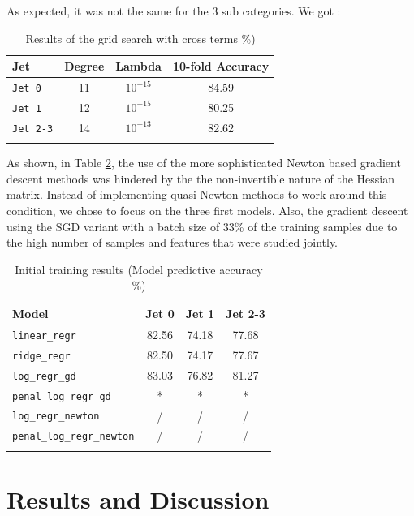 \documentclass[10pt,conference,compsocconf]{IEEEtran}
\begin{document}
As expected, it was not the same for the 3 sub categories. We got :
\begin{table}[h!]
\centering
\caption{Results of the grid search with cross terms \%)}
\footnotesize
\hspace{-0.2cm}
\begin{tabular}{ l| ccc } 
 \hline
   Jet & Degree & Lambda & 10-fold Accuracy  \\
 \hline
   \verb+Jet 0+  & 11 & $10^{-15}$  & 84.59  \\
   \verb+Jet 1+  & 12 & $10^{-15}$  & 80.25 \\
   \verb+Jet 2-3+  & 14  &  $10^{-13}$ & 82.62 \\
  \hline
\label{grid_search_ridge_cross}
\end{tabular}
\end{table}


As shown, in Table \ref{tab_first_run}, the use of the  more sophisticated Newton based  gradient descent methods was hindered by the the non-invertible nature of the Hessian matrix. Instead of implementing quasi-Newton methods to work around this condition, we chose to focus on the three first models. Also, the gradient descent using the SGD variant with a batch size of 33\% of the training samples due to the high number of samples and features that were studied jointly. 
 
\begin{table}[h!]
\centering
\caption{Initial training results (Model predictive accuracy \%)}
\footnotesize
\hspace{-0.2cm}
\begin{tabular}{ l| ccc } 
 \hline
   Model & Jet 0 & Jet 1 & Jet 2-3  \\
 \hline
   \verb+linear_regr+  & 82.56 &74.18  & 77.68  \\
   \verb+ridge_regr+  & 82.50 & 74.17  & 77.67 \\
   \verb+log_regr_gd+  & 83.03  &  76.82 & 81.27 \\
   \verb+penal_log_regr_gd+  & * & * &  * \\ 
   \verb+log_regr_newton+  & / & / & / \\
   \verb+penal_log_regr_newton+ &  / & / & / \\
  \hline
\label{tab_first_run}
\end{tabular}
\end{table}

\section{Results and Discussion}
\end{document}

